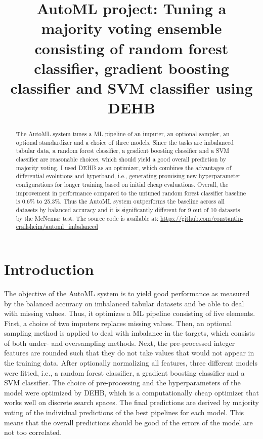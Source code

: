 \documentclass[11pt]{article}
\title{AutoML project: Tuning a majority voting ensemble consisting of random forest classifier, gradient boosting classifier and SVM classifier using DEHB}
\author[1]{\nameemail{Constantin von Crailsheim}{C.Crailsheim@campus.lmu.de}}
\affil[1]{LMU Munich, Institute of Statistics}
\begin{document}
\maketitle

\begin{abstract}
The AutoML system tunes a ML pipeline of an imputer, an optional sampler, an optional standardizer and a choice of three models. Since the tasks are imbalanced tabular data, a random forest classifier, a gradient boosting classifier and a SVM classifier are reasonable choices, which should yield a good overall prediction by majority voting. I used DEHB as an optimizer, which combines the advantages of differential evolutions and hyperband, i.e., generating promising new hyperparameter configurations for longer training based on initial cheap evaluations. Overall, the improvement in performance compared to the untuned random forest classifier baseline is 0.6\% to 25.3\%. Thus the AutoML system outperforms the baseline across all datasets by balanced accuracy and it is significantly different for 9 out of 10 datasets by the McNemar test. The source code is available at: \newline \url{https://github.com/constantin-crailsheim/automl_imbalanced}
\end{abstract}



\section{Introduction}

The objective of the AutoML system is to yield good performance as measured by the balanced accuracy on imbalanced tabular datasets and be able to deal with missing values. Thus, it optimizes a ML pipeline consisting of five elements. First, a choice of two imputers replaces missing values. Then, an optional sampling method is applied to deal with imbalance in the targets, which consists of both under- and oversampling methods. Next, the pre-processed integer features are rounded such that they do not take values that would not appear in the training data. After optionally normalizing all features, three different models were fitted, i.e., a random forest classifier, a gradient boosting classifier and a SVM classifier. The choice of pre-processing and the hyperparameters of the model were optimized by DEHB, which is a computationally cheap optimizer that works well on discrete search spaces. The final predictions are derived by majority voting of the individual predictions of the best pipelines for each model. This means that the overall predictions should be good of the errors of the model are not too correlated.
\end{document}
